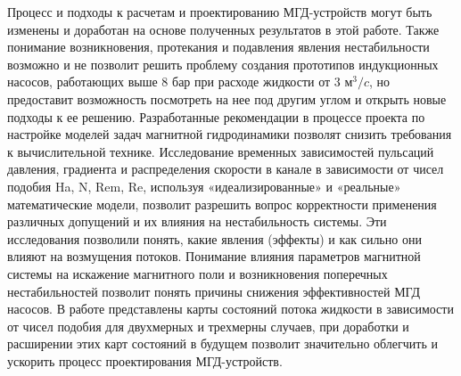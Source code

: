 {\influence} Процесс и подходы к расчетам и проектированию МГД-устройств могут быть изменены и доработан на основе полученных результатов в этой работе. Также понимание возникновения, протекания и подавления явления нестабильности возможно и не позволит решить проблему создания прототипов индукционных насосов, работающих выше 8 бар при расходе жидкости от 3 $м^3/c$, но предоставит возможность посмотреть на нее под другим углом и открыть новые подходы к ее решению. Разработанные рекомендации в процессе проекта по настройке моделей задач магнитной гидродинамики позволят снизить требования к вычислительной технике. Исследование временных зависимостей пульсаций давления, градиента и распределения скорости в канале в зависимости от чисел подобия Ha, N, Rem, Re, используя «идеализированные» и «реальные» математические модели, позволит разрешить вопрос корректности применения различных допущений и их влияния на нестабильность системы. Эти исследования позволили понять, какие явления (эффекты) и как сильно они влияют на возмущения потоков. Понимание влияния параметров магнитной системы на искажение магнитного поли и возникновения поперечных нестабильностей позволит понять причины снижения эффективностей МГД насосов. В работе представлены карты состояний потока жидкости в зависимости от чисел подобия для двухмерных и трехмерны случаев, при доработки и расширении этих карт состояний в будущем позволит значительно облегчить и ускорить процесс проектирования МГД-устройств. 

